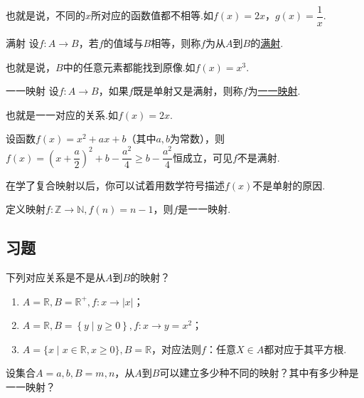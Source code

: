 \documentclass[lang=cn,math=cm,chinesefont=nofont,11pt,scheme=chinese,twocol]{elegantbook}
\begin{document}
也就是说，不同的$x$所对应的函数值都不相等.如$f(x)=2x$，$g(x)=\dfrac{1}{x}$.

\begin{definition}{满射}
  设$f:A\rightarrow B$，若$f$的值域与$B$相等，则称$f$为从$A$到$B$的\underline{满射}.
\end{definition}

也就是说，$B$中的任意元素都能找到原像.如$f(x)=x^3$.

\begin{definition}{一一映射}
  设$f:A\rightarrow B$，如果$f$既是单射又是满射，则称$f$为\underline{一一映射}.
\end{definition}

也就是一一对应的关系.如$f(x)=2x$.

\begin{example}
  设函数$f(x)=x^2+ax+b$（其中$a,b$为常数），则$f(x)=(x+\dfrac{a}{2})^2+b-\dfrac{a^2}{4}\geqslant b-\dfrac{a^2}{4}$恒成立，可见$f$不是满射.

  在学了复合映射以后，你可以试着用数学符号描述$f(x)$不是单射的原因.
\end{example}

\begin{example}
  定义映射$f:\mathbb{Z}\rightarrow\mathbb{N},f(n)=n-1$，则$f$是一一映射.
\end{example}

\subsection{习题}

\begin{exercise}\label{HS2FZ_lkb1_P34_exp.4,BJSZ_Algebra1_P40}
  下列对应关系是不是从$A$到$B$的映射？
\end{exercise}

\begin{enumerate}
  \item $A=\mathbb{R},B=\mathbb{R}^{+},f:x\rightarrow\left|x\right|$；
  \item $A=\mathbb{R},B=\left\{y\mid y\geqslant 0\right\},f:x\rightarrow y=x^2$；
  \item $A=\{x\mid x\in\mathbb{R},x\geqslant0\},B=\mathbb{R}$，对应法则$f$：任意$X\in A$都对应于其平方根.
\end{enumerate}

\begin{exercise}
  设集合$A={a,b},B={m,n}$，从$A$到$B$可以建立多少种不同的映射？其中有多少种是一一映射？
\end{exercise}
\end{document}
